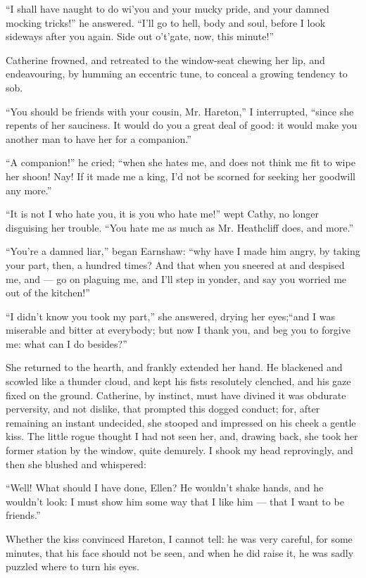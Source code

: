 \par “I shall have naught to do wi'you and your mucky pride, and your damned mocking tricks!” he answered. “I'll go to hell, body and soul, before I look sideways after you again. Side out o't'gate, now, this minute!”
\par Catherine frowned, and retreated to the window-seat chewing her lip, and endeavouring, by humming an eccentric tune, to conceal a growing tendency to sob.
\par “You should be friends with your cousin, Mr. Hareton,” I interrupted, “since she repents of her sauciness. It would do you a great deal of good: it would make you another man to have her for a companion.”
\par “A companion!” he cried; “when she hates me, and does not think me fit to wipe her shoon! Nay! If it made me a king, I'd not be scorned for seeking her goodwill any more.”
\par “It is not I who hate you, it is you who hate me!” wept Cathy, no longer disguising her trouble. “You hate me as much as Mr. Heathcliff does, and more.”
\par “You're a damned liar,” began Earnshaw: “why have I made him angry, by taking your part, then, a hundred times? And that when you sneered at and despised me, and — go on plaguing me, and I'll step in yonder, and say you worried me out of the kitchen!”
\par “I didn't know you took my part,” she answered, drying her eyes;“and I was miserable and bitter at everybody; but now I thank you, and beg you to forgive me: what can I do besides?”
\par She returned to the hearth, and frankly extended her hand. He blackened and scowled like a thunder cloud, and kept his fists resolutely clenched, and his gaze fixed on the ground. Catherine, by instinct, must have divined it was obdurate perversity, and not dislike, that prompted this dogged conduct; for, after remaining an instant undecided, she stooped and impressed on his cheek a gentle kiss. The little rogue thought I had not seen her, and, drawing back, she took her former station by the window, quite demurely. I shook my head reprovingly, and then she blushed and whispered:
\par “Well! What should I have done, Ellen? He wouldn't shake hands, and he wouldn't look: I must show him some way that I like him — that I want to be friends.”
\par Whether the kiss convinced Hareton, I cannot tell: he was very careful, for some minutes, that his face should not be seen, and when he did raise it, he was sadly puzzled where to turn his eyes.
